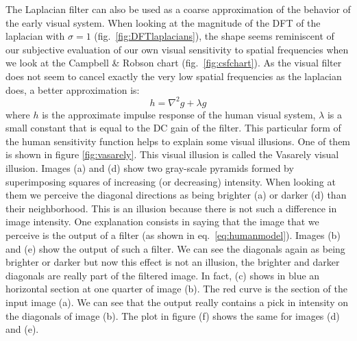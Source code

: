 The Laplacian filter can also be used as a coarse approximation of the behavior of the early visual system. When looking at the magnitude of the DFT of the laplacian with $\sigma=1$ (fig.~\ref{fig:DFTlaplacians}), the shape seems reminiscent of our subjective evaluation of our own visual sensitivity to spatial frequencies when we look at the Campbell \& Robson chart (fig.~\ref{fig:csfchart}). As the visual filter does not seem to cancel exactly the very low spatial frequencies as the laplacian does, a better approximation is:
\begin{equation}
h = \nabla^2 g  + \lambda g
\label{eq:humanmodel}
\end{equation}
where $h$ is the approximate impulse response of the human visual system, $\lambda$ is a small constant that is equal to the DC gain of the filter. This particular form of the human sensitivity function helps to explain some visual illusions. One of them is shown in figure \ref{fig:vasarely}. This visual illusion is called the Vasarely visual illusion. Images (a) and (d) show two gray-scale pyramids  formed by superimposing squares of increasing (or decreasing) intensity. When looking at them we perceive the diagonal directions as being brighter (a) or darker (d) than their neighborhood. This is an illusion because there is not such a difference in image intensity.  One explanation consists in saying that the image that we perceive is the output of a filter (as shown in eq.~\ref{eq:humanmodel}). Images (b) and (e) show the output of such a filter. We can see the diagonals again as being brighter or darker but now this effect is not an illusion, the brighter and darker diagonals are really part of the filtered image. In fact, (c) shows in blue an horizontal section at one quarter of image (b). The red curve is the section of the input image (a). We can see that the output really contains a pick in intensity on the diagonals of image (b). The plot in figure (f) shows the same for images (d) and (e).

